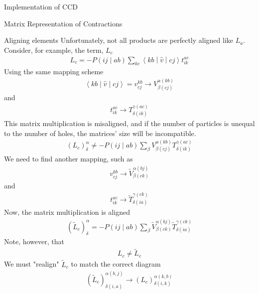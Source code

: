 \documentclass[twoside,english]{uiofysmaster}
\begin{document}
\begin{chapter}{Implementation of CCD}
\begin{section}{Matrix Representation of Contractions}
		\begin{subsection}{Aligning elements}	
			Unfortunately, not all products are perfectly aligned like $L_a$. Consider, for example, the term, $L_c$
			\begin{align}
				L_c = -P\left(ij\middle|ab\right) \sum_{kc} \left<kb\middle|\hat v\middle|cj\right>t_{ik}^{ac}
			\end{align}
			Using the same mapping scheme
			\begin{align}
				\left<kb\middle|\hat v\middle|cj\right> = v_{cj}^{kb} \rightarrow V_{\beta(cj)}^{\alpha(kb)}
			\end{align}
			and
			\begin{align}
				t_{ik}^{ac} \rightarrow T_{\delta(ik)}^{\gamma(ac)}
			\end{align}
			This matrix multiplication is misaligned, and if the number of particles is unequal to the number of holes, the matrices' size will be incompatible. 
			\begin{align}
				(L_c)_ \delta^\alpha \neq -P\left(ij\middle|ab\right) \sum_ \beta V_{\beta(cj)}^{\alpha(kb)} T_{\delta(ik)}^{\gamma(ac)}
			\end{align}
			We need to find another mapping, such as
			\begin{align}
				v_{cj}^{kb} \rightarrow \tilde V_{\beta(ck)}^{\alpha(bj)}
			\end{align}
			and 
			\begin{align}
				t_{ik}^{ac} \rightarrow \tilde T_{\delta(ia)}^{\gamma(ck)}
			\end{align}
			Now, the matrix multiplication is aligned
			\begin{align}
				(\tilde L_c)_ \delta^\alpha = -P\left(ij\middle|ab\right) \sum_ \beta \tilde V_{\beta(ck)}^{\alpha(bj)} \tilde T_{\delta(ia)}^{\gamma(ck)}
			\end{align}
			Note, however, that 
			\begin{align}
				L_c \neq \tilde L_c
			\end{align}
			We must "realign" $\tilde L_c$ to match the correct diagram
			\begin{align}
				(\tilde L_c)_{\delta(i,a)}^{\alpha(b,j)} \rightarrow (L_c)_{\delta(i,k)}^{\alpha(k,b)}
			\end{align}


\end{subsection}
\end{section}
\end{chapter}
\end{document}
